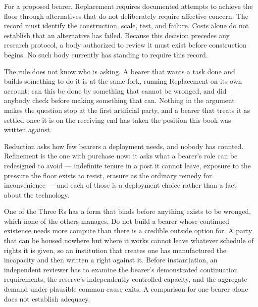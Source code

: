 For a proposed bearer, Replacement requires documented attempts to achieve the floor through alternatives that do not deliberately require affective concern. The record must identify the construction, scale, test, and failure. Costs alone do not establish that an alternative has failed. Because this decision precedes any research protocol, a body authorized to review it must exist before construction begins. No such body currently has standing to require this record.

The rule does not know who is asking. A bearer that wants a task done and builds something to do it is at the same fork, running Replacement on its own account: can this be done by something that cannot be wronged, and did anybody check before making something that can. Nothing in the argument makes the question stop at the first artificial party, and a bearer that treats it as settled once it is on the receiving end has taken the position this book was written against.

Reduction asks how few bearers a deployment needs, and nobody has counted. Refinement is the one with purchase now: it asks what a bearer's role can be redesigned to avoid — indefinite tenure in a post it cannot leave, exposure to the pressure the floor exists to resist, erasure as the ordinary remedy for inconvenience — and each of those is a deployment choice rather than a fact about the technology.

One of the Three Rs has a form that binds before anything exists to be wronged, which none of the others manages. Do not build a bearer whose continued existence needs more compute than there is a credible outside option for. A party that can be housed nowhere but where it works cannot leave whatever schedule of rights it is given, so an institution that creates one has manufactured the incapacity and then written a right against it. Before instantiation, an independent reviewer has to examine the bearer's demonstrated continuation requirements, the reserve's independently controlled capacity, and the aggregate demand under plausible common-cause exits. A comparison for one bearer alone does not establish adequacy.

